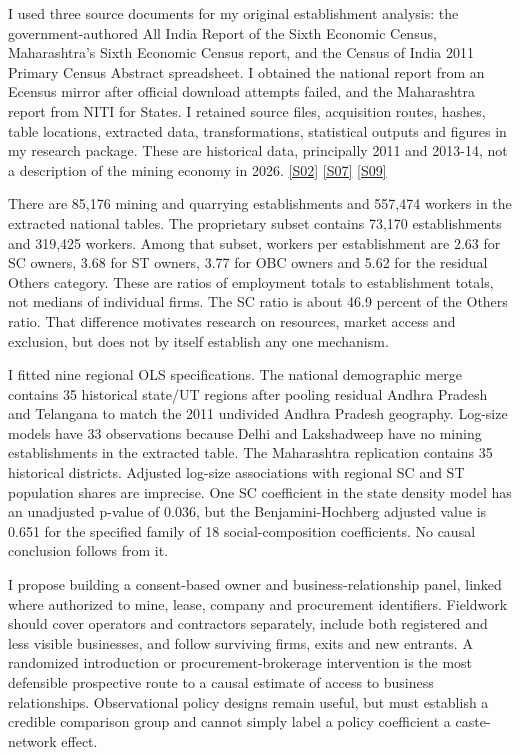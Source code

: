 \documentclass[11pt,a4paper]{report}
\begin{document}
I used three source documents for my original establishment analysis: the government-authored All India Report of the Sixth Economic Census, Maharashtra's Sixth Economic Census report, and the Census of India 2011 Primary Census Abstract spreadsheet. I obtained the national report from an Ecensus mirror after official download attempts failed, and the Maharashtra report from NITI for States. I retained source files, acquisition routes, hashes, table locations, extracted data, transformations, statistical outputs and figures in my research package. These are historical data, principally 2011 and 2013-14, not a description of the mining economy in 2026. \hyperlink{S02}{[S02]} \hyperlink{S07}{[S07]} \hyperlink{S09}{[S09]}

There are 85,176 mining and quarrying establishments and 557,474 workers in the extracted national tables. The proprietary subset contains 73,170 establishments and 319,425 workers. Among that subset, workers per establishment are 2.63 for SC owners, 3.68 for ST owners, 3.77 for OBC owners and 5.62 for the residual Others category. These are ratios of employment totals to establishment totals, not medians of individual firms. The SC ratio is about 46.9 percent of the Others ratio. That difference motivates research on resources, market access and exclusion, but does not by itself establish any one mechanism.

I fitted nine regional OLS specifications. The national demographic merge contains 35 historical state/\allowbreak{}UT regions after pooling residual Andhra Pradesh and Telangana to match the 2011 undivided Andhra Pradesh geography. Log-size models have 33 observations because Delhi and Lakshadweep have no mining establishments in the extracted table. The Maharashtra replication contains 35 historical districts. Adjusted log-size associations with regional SC and ST population shares are imprecise. One SC coefficient in the state density model has an unadjusted p-value of 0.036, but the Benjamini-Hochberg adjusted value is 0.651 for the specified family of 18 social-composition coefficients. No causal conclusion follows from it.

I propose building a consent-based owner and business-relationship panel, linked where authorized to mine, lease, company and procurement identifiers. Fieldwork should cover operators and contractors separately, include both registered and less visible businesses, and follow surviving firms, exits and new entrants. A randomized introduction or procurement-brokerage intervention is the most defensible prospective route to a causal estimate of access to business relationships. Observational policy designs remain useful, but must establish a credible comparison group and cannot simply label a policy coefficient a caste-network effect.
\end{document}
